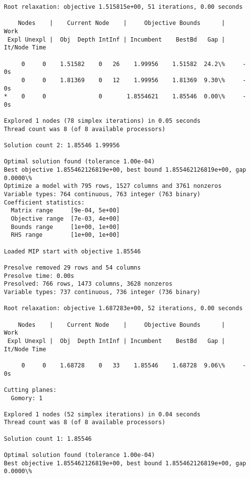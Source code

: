 \documentclass[11pt]{article}
\begin{document}
\begin{Verbatim}[commandchars=\\\{\}]
Root relaxation: objective 1.515815e+00, 51 iterations, 0.00 seconds

    Nodes    |    Current Node    |     Objective Bounds      |     Work
 Expl Unexpl |  Obj  Depth IntInf | Incumbent    BestBd   Gap | It/Node Time

     0     0    1.51582    0   26    1.99956    1.51582  24.2\%     -    0s
     0     0    1.81369    0   12    1.99956    1.81369  9.30\%     -    0s
*    0     0               0       1.8554621    1.85546  0.00\%     -    0s

Explored 1 nodes (78 simplex iterations) in 0.05 seconds
Thread count was 8 (of 8 available processors)

Solution count 2: 1.85546 1.99956 

Optimal solution found (tolerance 1.00e-04)
Best objective 1.855462126819e+00, best bound 1.855462126819e+00, gap 0.0000\%
Optimize a model with 795 rows, 1527 columns and 3761 nonzeros
Variable types: 764 continuous, 763 integer (763 binary)
Coefficient statistics:
  Matrix range     [9e-04, 5e+00]
  Objective range  [7e-03, 4e+00]
  Bounds range     [1e+00, 1e+00]
  RHS range        [1e+00, 1e+00]

Loaded MIP start with objective 1.85546

Presolve removed 29 rows and 54 columns
Presolve time: 0.00s
Presolved: 766 rows, 1473 columns, 3628 nonzeros
Variable types: 737 continuous, 736 integer (736 binary)

Root relaxation: objective 1.687283e+00, 52 iterations, 0.00 seconds

    Nodes    |    Current Node    |     Objective Bounds      |     Work
 Expl Unexpl |  Obj  Depth IntInf | Incumbent    BestBd   Gap | It/Node Time

     0     0    1.68728    0   33    1.85546    1.68728  9.06\%     -    0s

Cutting planes:
  Gomory: 1

Explored 1 nodes (52 simplex iterations) in 0.04 seconds
Thread count was 8 (of 8 available processors)

Solution count 1: 1.85546 

Optimal solution found (tolerance 1.00e-04)
Best objective 1.855462126819e+00, best bound 1.855462126819e+00, gap 0.0000\%

    \end{Verbatim}
\end{document}
